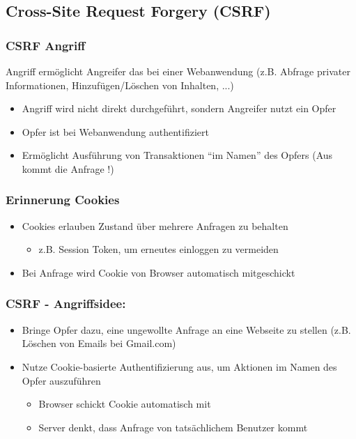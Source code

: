 \subsection{Cross-Site Request Forgery (CSRF)}
\subsubsection*{CSRF Angriff}
Angriff ermöglicht Angreifer das  bei einer Webanwendung (z.B. Abfrage privater Informationen, Hinzufügen/Löschen von Inhalten, ...)
\begin{itemize}
    \item Angriff wird nicht direkt durchgeführt, sondern Angreifer nutzt ein Opfer
    \item Opfer ist bei Webanwendung authentifiziert
    \item Ermöglicht Ausführung von Transaktionen \enquote{im Namen} des Opfers (Aus  kommt die Anfrage !)
\end{itemize}
\subsubsection*{Erinnerung Cookies}
\begin{itemize}
    \item Cookies erlauben Zustand über mehrere Anfragen zu behalten
    \begin{itemize}
        \item z.B. Session Token, um erneutes einloggen zu vermeiden
    \end{itemize}
    \item Bei Anfrage wird Cookie von Browser automatisch mitgeschickt
\end{itemize}
\subsubsection*{CSRF - Angriffsidee:}
\begin{itemize}
    \item Bringe Opfer dazu, eine ungewollte Anfrage an eine Webseite zu stellen (z.B. Löschen von Emails bei Gmail.com)
    \item Nutze Cookie-basierte Authentifizierung aus, um Aktionen im Namen des Opfer auszuführen
    \begin{itemize}
        \item Browser schickt Cookie automatisch mit
        \item Server denkt, dass Anfrage von tatsächlichem Benutzer kommt
    \end{itemize}
\end{itemize}
